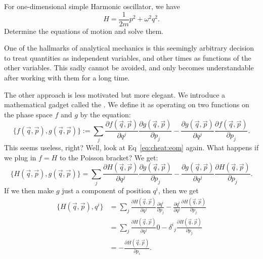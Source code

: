 \begin{exercise}
  For one-dimensional simple Harmonic oscillator, we have
  \begin{equation}
H = \frac{1}{2m}p^{2} + \omega^{2}q^{2}.
  \end{equation}
Determine the equations of motion and solve them.
\end{exercise}

\begin{remark}
One of the hallmarks of analytical mechanics is this seemingly arbitrary
decision to treat quantities as independent variables, and other times
as functions of the other variables. This sadly cannot be avoided, and
only becomes understandable after working with them for a long time.
\end{remark}

The other approach is less motivated but more elegant. We introduce a
mathematical gadget called the . We define it as
operating on two functions on the phase space $f$ and $g$ by the equation:
\begin{equation}
  \{f(\vec{q},\vec{p}), g(\vec{q},\vec{p})\}
  := \sum_{j}\frac{\partial f(\vec{q},\vec{p})}{\partial q^{j}}\frac{\partial g(\vec{q},\vec{p})}{\partial p_{j}}
  -\frac{\partial g(\vec{q},\vec{p})}{\partial q^{j}}\frac{\partial f(\vec{q},\vec{p})}{\partial p_{j}}.
\end{equation}
This seems useless, right? Well, look at Eq~\eqref{eq:cheat:eom} again.
What happens if we plug in $f=H$ to the Poisson bracket? We get:
\begin{equation}
  \{H(\vec{q},\vec{p}), g(\vec{q},\vec{p})\}
  = \sum_{j}\frac{\partial H(\vec{q},\vec{p})}{\partial q^{j}}\frac{\partial g(\vec{q},\vec{p})}{\partial p_{j}}
  -\frac{\partial g(\vec{q},\vec{p})}{\partial q^{j}}\frac{\partial H(\vec{q},\vec{p})}{\partial p_{j}}.
\end{equation}
If we then make $g$ just a component of position $q^{i}$, then we get
\begin{subequations}
\begin{align}
  \{H(\vec{q},\vec{p}), q^{i}\}
  &= \sum_{j}\frac{\partial H(\vec{q},\vec{p})}{\partial q^{j}}\frac{\partial q^{i}}{\partial p_{j}}
  -\frac{\partial q^{i}}{\partial q^{j}}\frac{\partial H(\vec{q},\vec{p})}{\partial p_{j}}\\
  &= \sum_{j}\frac{\partial H(\vec{q},\vec{p})}{\partial q^{j}}0
  -{\delta^{i}}_{j}\frac{\partial H(\vec{q},\vec{p})}{\partial p_{j}}\\
  &= -\frac{\partial H(\vec{q},\vec{p})}{\partial p_{i}}.
\end{align}
\end{subequations}
